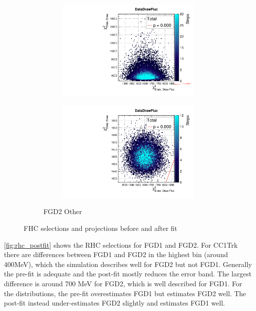 \begin{figure}[h]
\begin{subfigure}[t]{\textwidth}
\begin{subfigure}[t]{0.24\textwidth}
\includegraphics[width=\textwidth, trim={0mm 0mm 0mm 8mm}, clip,page=56]{figures/mach3/data/priorpred/2017b_NewDet_3Xsec_4Det_5Flux_NewXSecTune_Data_merge_PriorPred_procs}
\end{subfigure}
\begin{subfigure}[t]{0.24\textwidth}
	\includegraphics[width=\textwidth, trim={0mm 0mm 0mm 8mm}, clip,page=56]{figures/mach3/data/postpred/2017b_NewData_NewDet_UpdXsecStep_2Xsec_4Det_5Flux_0_PostPred_procs}
\end{subfigure}
\caption{FGD2 Other}
\end{subfigure}
\caption{FHC selections \pmu and \cosmu projections before and after fit}
\label{fig:fhc_postfit_other}
\end{figure}

\autoref{fig:rhc_postfit} shows the RHC \numubar selections for FGD1 and FGD2. For CC1Trk there are differences between FGD1 and FGD2 in the highest bin (around 400MeV), which the simulation describes well for FGD2 but not FGD1. Generally the pre-fit is adequate and the post-fit mostly reduces the error band. The largest difference is around 700 MeV for FGD2, which is well described for FGD1. For the \cosmu distributions, the pre-fit overestimates FGD1 but estimates FGD2 well. The post-fit instead under-estimates FGD2 slightly and estimates FGD1 well.

